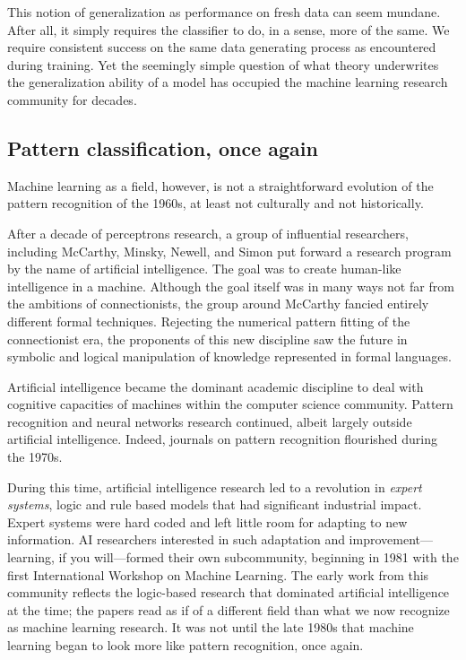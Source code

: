 \documentclass{tufte-book}
\begin{document}
This notion of generalization as performance on fresh data can seem
mundane. After all, it simply requires the classifier to do, in a sense,
more of the same. We require consistent success on the same data
generating process as encountered during training. Yet the seemingly
simple question of what theory underwrites the generalization ability of
a model has occupied the machine learning research community for
decades.

\hypertarget{pattern-classification-once-again}{%
\subsection{Pattern classification, once
again}\label{pattern-classification-once-again}}

Machine learning as a field, however, is not a straightforward evolution
of the pattern recognition of the 1960s, at least not culturally and not
historically.

After a decade of perceptrons research, a group of influential
researchers, including McCarthy, Minsky, Newell, and Simon put forward a
research program by the name of artificial intelligence. The goal was to
create human-like intelligence in a machine. Although the goal itself
was in many ways not far from the ambitions of connectionists, the group
around McCarthy fancied entirely different formal techniques. Rejecting
the numerical pattern fitting of the connectionist era, the proponents
of this new discipline saw the future in symbolic and logical
manipulation of knowledge represented in formal languages.

Artificial intelligence became the dominant academic discipline to deal
with cognitive capacities of machines within the computer science
community. Pattern recognition and neural networks research continued,
albeit largely outside artificial intelligence. Indeed, journals on
pattern recognition flourished during the 1970s.

During this time, artificial intelligence research led to a revolution
in \emph{expert systems}, logic and rule based models that had
significant industrial impact. Expert systems were hard coded and left
little room for adapting to new information. AI researchers interested
in such adaptation and improvement---learning, if you will---formed
their own subcommunity, beginning in 1981 with the first International
Workshop on Machine Learning. The early work from this community
reflects the logic-based research that dominated artificial intelligence
at the time; the papers read as if of a different field than what we now
recognize as machine learning research. It was not until the late 1980s
that machine learning began to look more like pattern recognition, once
again.
\end{document}
